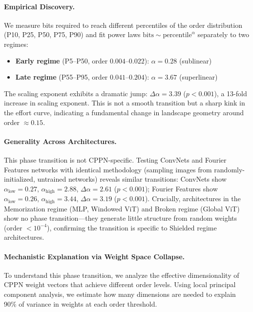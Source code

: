 \documentclass{article}
\begin{document}
\paragraph{Empirical Discovery.} We measure bits required to reach different percentiles of the order distribution (P10, P25, P50, P75, P90) and fit power laws $\mathrm{bits} \sim \mathrm{percentile}^{\alpha}$ separately to two regimes:
\begin{itemize}
    \item \textbf{Early regime} (P5--P50, order $0.004$--$0.022$): $\alpha = 0.28$ (sublinear)
    \item \textbf{Late regime} (P55--P95, order $0.041$--$0.204$): $\alpha = 3.67$ (superlinear)
\end{itemize}

The scaling exponent exhibits a dramatic jump: $\Delta\alpha = 3.39$ ($p < 0.001$), a 13-fold increase in scaling exponent. This is not a smooth transition but a sharp kink in the effort curve, indicating a fundamental change in landscape geometry around order $\approx 0.15$.

\paragraph{Generality Across Architectures.} This phase transition is not CPPN-specific. Testing ConvNets and Fourier Features networks with identical methodology (sampling images from randomly-initialized, untrained networks) reveals similar transitions: ConvNets show $\alpha_{\text{low}} = 0.27$, $\alpha_{\text{high}} = 2.88$, $\Delta\alpha = 2.61$ ($p < 0.001$); Fourier Features show $\alpha_{\text{low}} = 0.26$, $\alpha_{\text{high}} = 3.44$, $\Delta\alpha = 3.19$ ($p < 0.001$). Crucially, architectures in the Memorization regime (MLP, Windowed ViT) and Broken regime (Global ViT) show no phase transition---they generate little structure from random weights (order $< 10^{-4}$), confirming the transition is specific to Shielded regime architectures.

\paragraph{Mechanistic Explanation via Weight Space Collapse.} To understand this phase transition, we analyze the effective dimensionality of CPPN weight vectors that achieve different order levels. Using local principal component analysis, we estimate how many dimensions are needed to explain 90\% of variance in weights at each order threshold.
\end{document}

